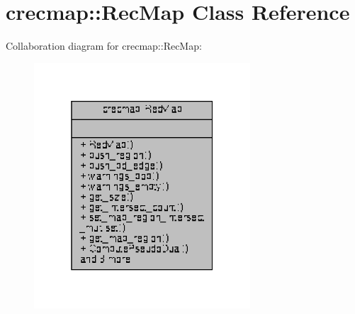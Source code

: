 \hypertarget{classcrecmap_1_1RecMap}{}\section{crecmap\+:\+:Rec\+Map Class Reference}
\label{classcrecmap_1_1RecMap}


Collaboration diagram for crecmap\+:\+:Rec\+Map\+:\nopagebreak
\begin{figure}[H]
\begin{center}
\leavevmode
\includegraphics[width=229pt]{classcrecmap_1_1RecMap__coll__graph}
\end{center}
\end{figure}
